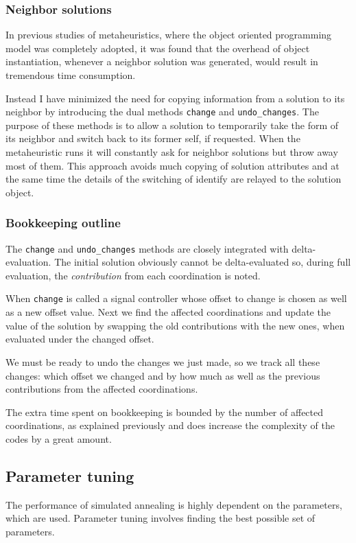 \subsubsection{Neighbor solutions}
In previous studies of metaheuristics, where the object oriented programming model was completely adopted, it was found that the overhead of object instantiation, whenever a neighbor solution was generated, would result in tremendous time consumption. 

Instead I have minimized the need for copying information from a solution to its neighbor by introducing the dual methods \verb|change| and \verb|undo_changes|. The purpose of these methods is to allow a solution to temporarily take the form of its neighbor and switch back to its former self, if requested. 
When the metaheuristic runs it will constantly ask for neighbor solutions but throw away most of them. This approach avoids much copying of solution attributes and at the same time the details of the switching of identify are relayed to the solution object.

\subsubsection{Bookkeeping outline}
The \verb|change| and \verb|undo_changes| methods are closely integrated with delta-evaluation. The initial solution obviously cannot be delta-evaluated so, during full evaluation, the \textit{contribution} from each coordination is noted. 

When \verb|change| is called a signal controller whose offset to change is chosen as well as a new offset value. Next we find the affected coordinations and update the value of the solution by swapping the old contributions with the new ones, when evaluated under the changed offset.

We must be ready to undo the changes we just made, so we track all these changes: which offset we changed and by how much as well as the previous contributions from the affected coordinations.

The extra time spent on bookkeeping is bounded by the number of affected coordinations, as explained previously and does increase the complexity of the codes by a great amount.

\subsection{Parameter tuning}
The performance of simulated annealing is highly dependent on the parameters, which are used. Parameter tuning involves finding the best possible set of parameters. 

